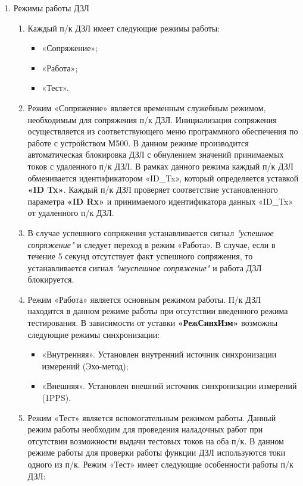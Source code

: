 \begin{enumerate}
\item Режимы работы ДЗЛ
\begin{enumerate}
\item Каждый п/к ДЗЛ имеет следующие режимы работы:
  \begin{itemize}
    \item «Сопряжение»;
    \item «Работа»;
    \item «Тест».
  \end{itemize}
\item Режим «Сопряжение» является временным служебным режимом, необходимым для сопряжения п/к ДЗЛ. Инициализация сопряжения осуществляется из соответствующего меню программного обеспечения по работе с устройством М500. В данном режиме производится автоматическая блокировка ДЗЛ с обнулением значений принимаемых токов с удаленного п/к ДЗЛ. В рамках данного режима каждый п/к ДЗЛ обменивается идентификатором «ID\_Tx», который определяется уставкой \textbf{«ID Tx»}. Каждый п/к ДЗЛ проверяет соответствие установленного параметра \textbf{«ID Rx»} и принимаемого идентификатора данных «ID\_Tx» от удаленного п/к ДЗЛ.
\item В случае успешного сопряжения устанавливается сигнал \textit{"успешное сопряжение"} и следует переход в режим «Работа». В случае, если в течение 5 секунд отсутствует факт успешного сопряжения, то устанавливается сигнал \textit{"неуспешное сопряжение"} и работа ДЗЛ блокируется.
\item Режим «Работа» является основным режимом работы. П/к ДЗЛ находится в данном режиме работы при отсутствии введенного режима тестирования. В зависимости от уставки \textbf{«РежСинхИзм»} возможны следующие режимы синхронизации:
  \begin{itemize}
    \item «Внутренняя». Установлен внутренний источник синхронизации измерений (Эхо-метод);
    \item «Внешняя». Установлен внешний источник синхронизации измерений (1PPS).
  \end{itemize}
\item Режим «Тест» является вспомогательным режимом работы. Данный режим работы необходим для проведения наладочных работ при отсутствии возможности выдачи тестовых токов на оба п/к. В данном режиме работы для проверки работы функции ДЗЛ используются токи одного из п/к. Режим «Тест» имеет следующие особенности работы п/к ДЗЛ:

\end{enumerate}
\end{enumerate}
